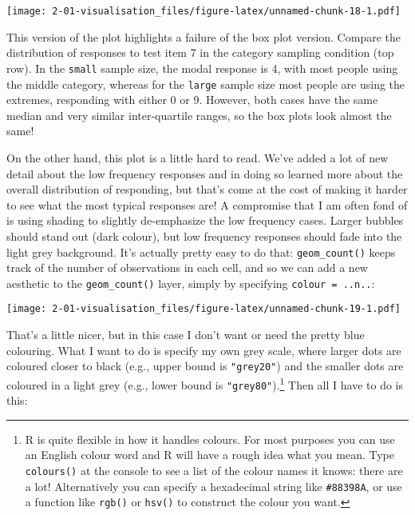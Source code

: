 \documentclass[]{book}
\newenvironment{Shaded}{\begin{snugshade}}{\end{snugshade}}
\newcommand{\DataTypeTok}[1]{\textcolor[rgb]{0.13,0.29,0.53}{#1}}
\newcommand{\KeywordTok}[1]{\textcolor[rgb]{0.13,0.29,0.53}{\textbf{#1}}}
\newcommand{\NormalTok}[1]{#1}
\newcommand{\OperatorTok}[1]{\textcolor[rgb]{0.81,0.36,0.00}{\textbf{#1}}}
\newcommand{\StringTok}[1]{\textcolor[rgb]{0.31,0.60,0.02}{#1}}
\let\rmarkdownfootnote\footnote%
\def\footnote{\protect\rmarkdownfootnote}
\begin{document}
\texttt{[image: 2-01-visualisation\_files/figure-latex/unnamed-chunk-18-1.pdf]}

This version of the plot highlights a failure of the box plot version. Compare the distribution of responses to test item 7 in the category sampling condition (top row). In the \texttt{small} sample size, the modal response is 4, with most people using the middle category, whereas for the \texttt{large} sample size most people are using the extremes, responding with either 0 or 9. However, both cases have the same median and very similar inter-quartile ranges, so the box plots look almost the same!

On the other hand, this plot is a little hard to read. We've added a lot of new detail about the low frequency responses and in doing so learned more about the overall distribution of responding, but that's come at the cost of making it harder to see what the most typical responses are! A compromise that I am often fond of is using shading to slightly de-emphasize the low frequency cases. Larger bubbles should stand out (dark colour), but low frequency responses should fade into the light grey background. It's actually pretty easy to do that: \texttt{geom\_count()} keeps track of the number of observations in each cell, and so we can add a new aesthetic to the \texttt{geom\_count()} layer, simply by specifying \texttt{colour\ =\ ..n..}:

\begin{Shaded}
\end{Shaded}

\texttt{[image: 2-01-visualisation\_files/figure-latex/unnamed-chunk-19-1.pdf]}

That's a little nicer, but in this case I don't want or need the pretty blue colouring. What I want to do is specify my own grey scale, where larger dots are coloured closer to black (e.g., upper bound is \texttt{"grey20"}) and the smaller dots are coloured in a light grey (e.g., lower bound is \texttt{"grey80"}).\footnote{R is quite flexible in how it handles colours. For most purposes you can use an English colour word and R will have a rough idea what you mean. Type \texttt{colours()} at the console to see a list of the colour names it knows: there are a lot! Alternatively you can specify a hexadecimal string like \texttt{\#88398A}, or use a function like \texttt{rgb()} or \texttt{hsv()} to construct the colour you want.} Then all I have to do is this:
\end{document}
